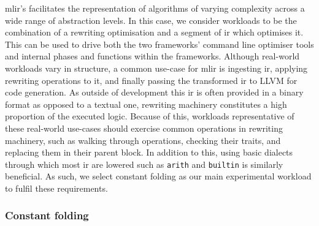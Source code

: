 \ac{mlir}'s facilitates the representation of algorithms of varying complexity across a wide range of abstraction levels.
In this case, we consider workloads to be the combination of a rewriting optimisation and a segment of \ac{ir} which optimises it. This can be used to drive both the two frameworks' command line optimiser tools and internal phases and functions within the frameworks.
Although real-world workloads vary in structure, a common use-case for \ac{mlir} is ingesting \ac{ir}, applying rewriting operations to it, and finally passing the transformed \ac{ir} to LLVM for code generation. As outside of development this \ac{ir} is often provided in a binary format as opposed to a textual one, rewriting machinery constitutes a high proportion of the executed logic.
Because of this, workloads representative of these real-world use-cases should exercise common operations in rewriting machinery, such as walking through operations, checking their traits, and replacing them in their parent block. In addition to this, using basic dialects through which most \acs{ir} are lowered such as \texttt{arith} and \texttt{builtin} is similarly beneficial.
As such, we select constant folding as our main experimental workload to fulfil these requirements.

\subsubsection{Constant folding}
\label{sssec:experimental-workload-constant-folding}

